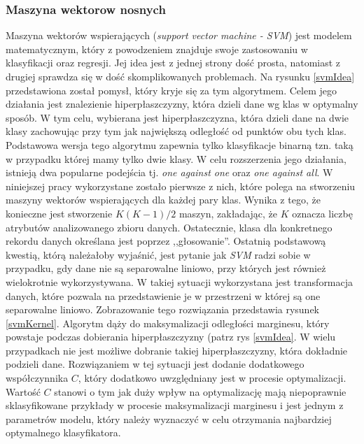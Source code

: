 \subsubsection{Maszyna wektorow nosnych}
Maszyna wektorów wspierających (\textit{support vector machine - SVM}) jest modelem matematycznym, który z powodzeniem znajduje swoje zastosowaniu w klasyfikacji oraz regresji. Jej idea jest z jednej strony dość prosta, natomiast z drugiej sprawdza się w dość skomplikowanych problemach\cite{svm1}. Na rysunku \ref{svmIdea} przedstawiona został pomysł, który kryje się za tym algorytmem. Celem jego działania jest znalezienie hiperpłaszczyzny, która dzieli dane wg klas w optymalny sposób. W tym celu, wybierana jest hiperpłaszczyzna, która dzieli dane na dwie klasy zachowując przy tym jak największą odległość od punktów obu tych klas\cite{svm2}. Podstawowa wersja tego algorytmu zapewnia tylko klasyfikacje binarną tzn. taką w przypadku której mamy tylko dwie klasy. W celu rozszerzenia jego działania, istnieją dwa popularne podejścia  tj. \textit{one against one} oraz \textit{one against all}\cite{svm3}. W niniejszej pracy wykorzystane zostało pierwsze z nich, które polega na stworzeniu maszyny wektorów wspierających dla każdej pary klas. Wynika z tego, że konieczne jest stworzenie $K(K-1)/2$ maszyn, zakładając, że $K$ oznacza liczbę atrybutów analizowanego zbioru danych. Ostatecznie, klasa dla konkretnego rekordu danych określana jest poprzez ,,głosowanie''. Ostatnią podstawową kwestią, którą należałoby wyjaśnić, jest pytanie jak \textit{SVM} radzi sobie w przypadku, gdy dane nie są separowalne liniowo, przy których jest również wielokrotnie wykorzystywana. W takiej sytuacji wykorzystana jest transformacja danych, które pozwala na przedstawienie je w przestrzeni w której są one separowalne liniowo. Zobrazowanie tego rozwiązania przedstawia rysunek \ref{svmKernel}. Algorytm dąży do maksymalizacji odległości marginesu, który powstaje podczas dobierania hiperpłaszczyzny (patrz rys \ref{svmIdea}. W wielu przypadkach nie jest możliwe dobranie takiej hiperpłaszczyzny, która dokładnie podzieli dane. Rozwiązaniem w tej sytuacji jest dodanie dodatkowego współczynnika $C$, który dodatkowo uwzględniany jest w procesie optymalizacji. Wartość $C$ stanowi o tym jak duży wpływ na optymalizację mają niepoprawnie sklasyfikowane przykłady w procesie maksymalizacji marginesu i jest jednym z parametrów modelu, który należy wyznaczyć w celu otrzymania najbardziej optymalnego klasyfikatora.

